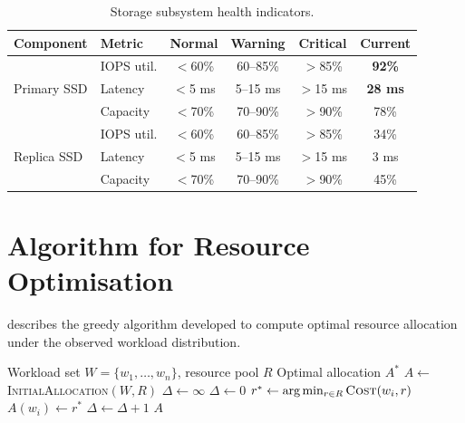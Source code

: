 \documentclass[
    language=english,
    doctype=technical-report,
    institution=none,
    titlestyle=book,
    oneside,
    loadGlossaries,
]{../../omnilatex}
\begin{document}
\begin{table}[htbp]
    \centering
    \caption{Storage subsystem health indicators.}
    \label{tab:storage-status}
    \begin{tabular}{@{}llcccc@{}}
        \toprule
        \textbf{Component} & \textbf{Metric} & \textbf{Normal} & \textbf{Warning} & \textbf{Critical} & \textbf{Current} \\
        \midrule
        \multirow{3}{*}{Primary SSD}
            & IOPS util.   & \cellcolor{green!20}$<$60\% & \cellcolor{yellow!30}60--85\% & \cellcolor{red!20}$>$85\% & \cellcolor{red!30}\textbf{92\%} \\
            & Latency      & \cellcolor{green!20}$<$5 ms & \cellcolor{yellow!30}5--15 ms & \cellcolor{red!20}$>$15 ms & \cellcolor{red!30}\textbf{28 ms} \\
            & Capacity     & \cellcolor{green!20}$<$70\% & \cellcolor{yellow!30}70--90\% & \cellcolor{red!20}$>$90\% & \cellcolor{yellow!30}78\% \\
        \midrule
        \multirow{3}{*}{Replica SSD}
            & IOPS util.   & \cellcolor{green!20}$<$60\% & \cellcolor{yellow!30}60--85\% & \cellcolor{red!20}$>$85\% & \cellcolor{green!20}34\% \\
            & Latency      & \cellcolor{green!20}$<$5 ms & \cellcolor{yellow!30}5--15 ms & \cellcolor{red!20}$>$15 ms & \cellcolor{green!20}3 ms \\
            & Capacity     & \cellcolor{green!20}$<$70\% & \cellcolor{yellow!30}70--90\% & \cellcolor{red!20}$>$90\% & \cellcolor{green!20}45\% \\
        \bottomrule
    \end{tabular}
\end{table}

\section{Algorithm for Resource Optimisation}

 describes the greedy algorithm developed to compute
optimal resource allocation under the observed workload distribution.

\begin{algorithm}[htbp]
\caption{Greedy resource allocation optimiser.}
\label{alg:optimise}
\begin{algorithmic}[1]
\REQUIRE Workload set $W = \{w_1, \ldots, w_n\}$, resource pool $R$
\ENSURE  Optimal allocation $A^*$
\STATE $A \gets$ \textsc{InitialAllocation}$(W, R)$
\STATE $\Delta \gets \infty$
\WHILE{$\Delta > \epsilon$}
    \STATE $\Delta \gets 0$
        \STATE $r^* \gets \arg\min_{r \in R} \textsc{Cost}(w_i, r)$
            \STATE $A(w_i) \gets r^*$
            \STATE $\Delta \gets \Delta + 1$
        \ENDIF
    \ENDFOR
\ENDWHILE
\RETURN $A$
\end{algorithmic}
\end{algorithm}
\end{document}
